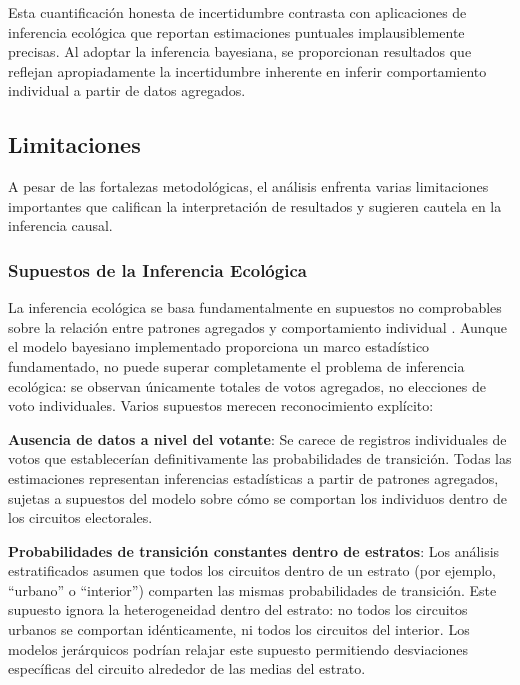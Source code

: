Esta cuantificación honesta de incertidumbre contrasta con aplicaciones de inferencia ecológica que reportan estimaciones puntuales implausiblemente precisas. Al adoptar la inferencia bayesiana, se proporcionan resultados que reflejan apropiadamente la incertidumbre inherente en inferir comportamiento individual a partir de datos agregados.

\subsection{Limitaciones}
\label{sec:discusion_limitaciones}

A pesar de las fortalezas metodológicas, el análisis enfrenta varias limitaciones importantes que califican la interpretación de resultados y sugieren cautela en la inferencia causal.

\subsubsection{Supuestos de la Inferencia Ecológica}

La inferencia ecológica se basa fundamentalmente en supuestos no comprobables sobre la relación entre patrones agregados y comportamiento individual \citep{king1997}. Aunque el modelo bayesiano implementado proporciona un marco estadístico fundamentado, no puede superar completamente el problema de inferencia ecológica: se observan únicamente totales de votos agregados, no elecciones de voto individuales. Varios supuestos merecen reconocimiento explícito:

\textbf{Ausencia de datos a nivel del votante}: Se carece de registros individuales de votos que establecerían definitivamente las probabilidades de transición. Todas las estimaciones representan inferencias estadísticas a partir de patrones agregados, sujetas a supuestos del modelo sobre cómo se comportan los individuos dentro de los circuitos electorales.

\textbf{Probabilidades de transición constantes dentro de estratos}: Los análisis estratificados asumen que todos los circuitos dentro de un estrato (por ejemplo, ``urbano'' o ``interior'') comparten las mismas probabilidades de transición. Este supuesto ignora la heterogeneidad dentro del estrato: no todos los circuitos urbanos se comportan idénticamente, ni todos los circuitos del interior. Los modelos jerárquicos podrían relajar este supuesto permitiendo desviaciones específicas del circuito alrededor de las medias del estrato.

